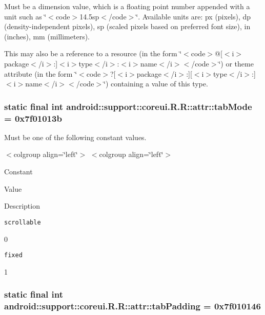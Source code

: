 Must be a dimension value, which is a floating point number appended with a unit such as \char`\"{}$<$code$>$14.5sp$<$/code$>$\char`\"{}. Available units are: px (pixels), dp (density-independent pixels), sp (scaled pixels based on preferred font size), in (inches), mm (millimeters). 

This may also be a reference to a resource (in the form \char`\"{}$<$code$>$@\mbox{[}$<$i$>$package$<$/i$>$:\mbox{]}$<$i$>$type$<$/i$>$:$<$i$>$name$<$/i$>$$<$/code$>$\char`\"{}) or theme attribute (in the form \char`\"{}$<$code$>$?\mbox{[}$<$i$>$package$<$/i$>$:\mbox{]}\mbox{[}$<$i$>$type$<$/i$>$:\mbox{]}$<$i$>$name$<$/i$>$$<$/code$>$\char`\"{}) containing a value of this type. \hypertarget{classandroid_1_1support_1_1coreui_1_1_r_1_1attr_96a61579b878ae9a5fe76c07bf3da566}{
\subsubsection[{tabMode}]{\setlength{\rightskip}{0pt plus 5cm}static final int android::support::coreui.R.R::attr::tabMode = 0x7f01013b}}
\label{classandroid_1_1support_1_1coreui_1_1_r_1_1attr_96a61579b878ae9a5fe76c07bf3da566}


Must be one of the following constant values. \begin{TabularC}{0}
\hline
\end{TabularC}
$<$colgroup align=\char`\"{}left\char`\"{}$>$ $<$colgroup align=\char`\"{}left\char`\"{}$>$ 

Constant

Value

Description 

{\tt scrollable}

0

{\tt fixed}

1\hypertarget{classandroid_1_1support_1_1coreui_1_1_r_1_1attr_25b639debb275d28adaef2c9d12a04cf}{
\subsubsection[{tabPadding}]{\setlength{\rightskip}{0pt plus 5cm}static final int android::support::coreui.R.R::attr::tabPadding = 0x7f010146}}
\label{classandroid_1_1support_1_1coreui_1_1_r_1_1attr_25b639debb275d28adaef2c9d12a04cf}


